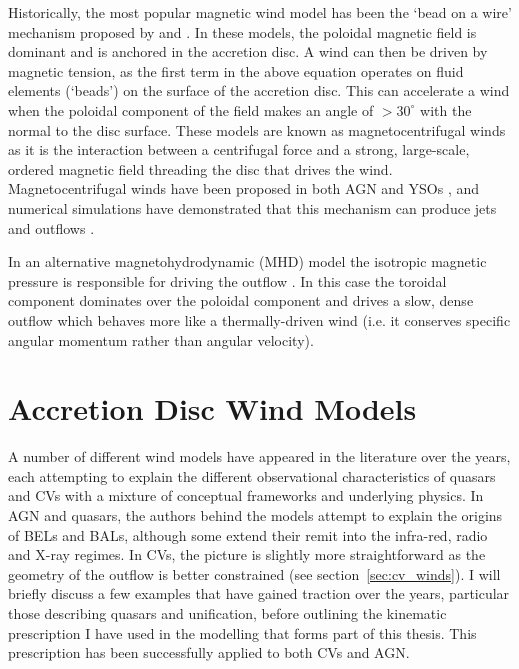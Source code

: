 Historically, the most popular magnetic wind model has been 
the `bead on a wire' mechanism proposed by \cite{blandfordpayne} and 
\cite{pelletier_pudritz}. In these models, 
the poloidal magnetic field is dominant and is anchored in the 
accretion disc. A wind can then be driven by magnetic tension, as the
first term in the above equation operates on fluid elements (`beads') 
on the surface of the accretion disc. This can accelerate
a wind when the poloidal component of the field makes an angle of 
$>30^\circ$ with the normal to the disc surface. These models
are known as magnetocentrifugal winds as it is the interaction between
a centrifugal force and a strong, large-scale, ordered magnetic field 
threading the disc that drives the wind. 
Magnetocentrifugal winds have been proposed in both
AGN and YSOs \citep{pelletier_pudritz,konigl1994,kudoh1997},
and numerical simulations have demonstrated that this mechanism can produce
jets and outflows \citep{romanova1997,ouyed1997,ustygova1999}.

In an alternative magnetohydrodynamic (MHD) model the isotropic magnetic pressure 
is responsible for driving the outflow \citep{proga2003a}.
In this case the toroidal component dominates over the poloidal component
and drives a slow, dense outflow which behaves more like a thermally-driven wind 
(i.e. it conserves specific angular momentum rather than angular velocity). 

\section{Accretion Disc Wind Models}
\label{sec:wind_models}

A number of different wind models have appeared in the literature over the 
years, each attempting to explain the different observational characteristics
of quasars and CVs with a mixture of conceptual frameworks and underlying physics.
In AGN and quasars, the authors behind the models attempt to explain the origins of 
BELs and BALs, although some extend their remit into the infra-red, 
radio and X-ray regimes. In CVs, the picture is slightly more straightforward as 
the geometry of the outflow is better constrained (see section~\ref{sec:cv_winds}).
I will briefly discuss a few examples that have gained traction over the years,
particular those describing quasars and unification,
before outlining the kinematic prescription I have used in the modelling that forms 
part of this thesis. This prescription has been successfully applied to both CVs 
and AGN.

